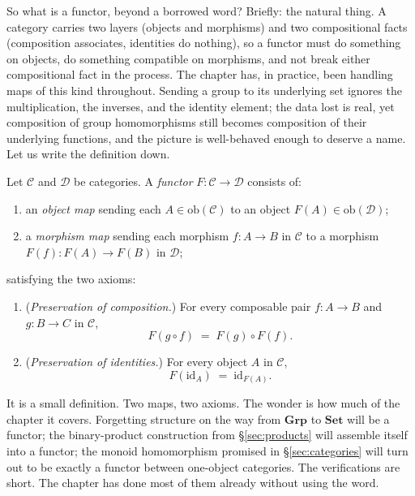 \noindent So what is a functor, beyond a borrowed word? Briefly:
the natural thing. A category carries two layers (objects and
morphisms) and two compositional facts (composition associates,
identities do nothing), so a functor must do something on
objects, do something compatible on morphisms, and not break
either compositional fact in the process. The chapter has, in
practice, been handling maps of this kind throughout. Sending a
group to its underlying set ignores the multiplication, the
inverses, and the identity element; the data lost is real, yet
composition of group homomorphisms still becomes composition of
their underlying functions, and the picture is well-behaved
enough to deserve a name. Let us write the definition down.

\begin{definition}[Functor]\label{def:functor}
Let $\mathcal{C}$ and $\mathcal{D}$ be categories. A
\textit{functor} $F : \mathcal{C} \to \mathcal{D}$
consists of:
\begin{enumerate}[label=\roman*)]
    \item an \textit{object map} sending each $A \in
    \mathrm{ob}(\mathcal{C})$ to an object $F(A) \in
    \mathrm{ob}(\mathcal{D})$;
    \item a \textit{morphism map} sending each morphism
    $f : A \to B$ in $\mathcal{C}$ to a morphism
    $F(f) : F(A) \to F(B)$ in $\mathcal{D}$;
\end{enumerate}
satisfying the two axioms:
\begin{enumerate}[label=(\arabic*)]
    \item (\textit{Preservation of composition.}) For every
    composable pair $f : A \to B$ and $g : B \to C$ in
    $\mathcal{C}$,
    \[ F(g \circ f) \; = \; F(g) \circ F(f). \]
    \item (\textit{Preservation of identities.}) For every
    object $A$ in $\mathcal{C}$,
    \[ F(\mathrm{id}_A) \; = \; \mathrm{id}_{F(A)}. \]
\end{enumerate}
\end{definition}

\noindent It is a small definition. Two maps, two axioms. The
wonder is how much of the chapter it covers. Forgetting
structure on the way from $\mathbf{Grp}$ to $\mathbf{Set}$ will
be a functor; the binary-product construction from
\S\ref{sec:products} will assemble itself into a functor; the
monoid homomorphism promised in \S\ref{sec:categories} will turn
out to be exactly a functor between one-object categories. The
verifications are short. The chapter has done most of them
already without using the word.

